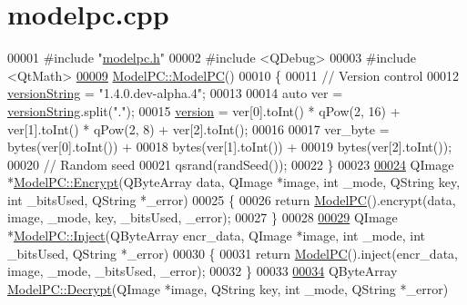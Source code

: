 \hypertarget{modelpc_8cpp_source}{}\section{modelpc.\+cpp}

\begin{DoxyCode}
00001 \textcolor{preprocessor}{#include "\hyperlink{modelpc_8h}{modelpc.h}"}
00002 \textcolor{preprocessor}{#include <QDebug>}
00003 \textcolor{preprocessor}{#include <QtMath>}
\hypertarget{modelpc_8cpp_source.tex_l00009}{}\hyperlink{class_model_p_c_ae12ebe65ec973c02a0de4850a7c1e31c}{00009} \hyperlink{class_model_p_c_ae12ebe65ec973c02a0de4850a7c1e31c}{ModelPC::ModelPC}()
00010 \{
00011     \textcolor{comment}{// Version control}
00012     \hyperlink{class_model_p_c_a5f426725ccf7eefd3c77ea8c720264c9}{versionString} = \textcolor{stringliteral}{"1.4.0.dev-alpha.4"};
00013 
00014     \textcolor{keyword}{auto} ver = \hyperlink{class_model_p_c_a5f426725ccf7eefd3c77ea8c720264c9}{versionString}.split(\textcolor{stringliteral}{"."});
00015     \hyperlink{class_model_p_c_a5af48ab89e19be42a94c34ba00249401}{version} = ver[0].toInt() * qPow(2, 16) + ver[1].toInt() * qPow(2, 8) + ver[2].toInt();
00016 
00017     ver\_byte = bytes(ver[0].toInt()) +
00018             bytes(ver[1].toInt()) +
00019             bytes(ver[2].toInt());
00020     \textcolor{comment}{// Random seed}
00021     qsrand(randSeed());
00022 \}
00023 
\hypertarget{modelpc_8cpp_source.tex_l00024}{}\hyperlink{class_model_p_c_a271cf9285e32df58ffbfc918e6482bbd}{00024} QImage *\hyperlink{class_model_p_c_a271cf9285e32df58ffbfc918e6482bbd}{ModelPC::Encrypt}(QByteArray data, QImage *image, \textcolor{keywordtype}{int} \_mode, QString key, \textcolor{keywordtype}{int} 
      \_bitsUsed, QString *\_error)
00025 \{
00026     \textcolor{keywordflow}{return} \hyperlink{class_model_p_c_ae12ebe65ec973c02a0de4850a7c1e31c}{ModelPC}().encrypt(data, image, \_mode, key, \_bitsUsed, \_error);
00027 \}
00028 
\hypertarget{modelpc_8cpp_source.tex_l00029}{}\hyperlink{class_model_p_c_ac17e68e6aab134621b0d151d74acdc82}{00029} QImage *\hyperlink{class_model_p_c_ac17e68e6aab134621b0d151d74acdc82}{ModelPC::Inject}(QByteArray encr\_data, QImage *image, \textcolor{keywordtype}{int} \_mode, \textcolor{keywordtype}{int} \_bitsUsed, 
      QString *\_error)
00030 \{
00031     \textcolor{keywordflow}{return} \hyperlink{class_model_p_c_ae12ebe65ec973c02a0de4850a7c1e31c}{ModelPC}().inject(encr\_data, image, \_mode, \_bitsUsed, \_error);
00032 \}
00033 
\hypertarget{modelpc_8cpp_source.tex_l00034}{}\hyperlink{class_model_p_c_a902abaea4f07995b48c0f2fea6eceb7c}{00034} QByteArray \hyperlink{class_model_p_c_a902abaea4f07995b48c0f2fea6eceb7c}{ModelPC::Decrypt}(QImage *image, QString key, \textcolor{keywordtype}{int} \_mode, QString *\_error)

\end{DoxyCode}
